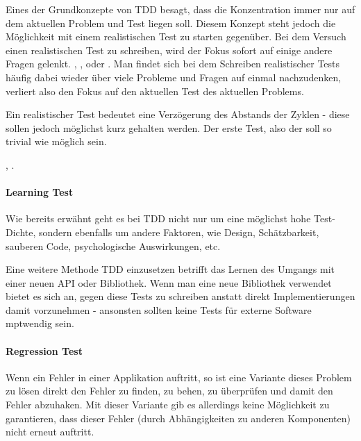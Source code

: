 Eines der Grundkonzepte von TDD besagt, dass die Konzentration immer nur auf dem aktuellen Problem und Test liegen soll. Diesem Konzept steht jedoch die Möglichkeit mit einem realistischen Test zu starten gegenüber. Bei dem Versuch einen realistischen Test zu schreiben, wird der Fokus sofort auf einige andere Fragen gelenkt. , ,  oder . Man findet sich bei dem Schreiben realistischer Tests häufig dabei wieder über viele Probleme und Fragen auf einmal nachzudenken, verliert also den Fokus auf den aktuellen Test des aktuellen Problems.

Ein realistischer Test bedeutet eine Verzögerung des Abstands der  Zyklen - diese sollen jedoch möglichst kurz gehalten werden.
Der erste Test, also der  soll so trivial wie möglich sein.

, \cite[134]{Beck:2003}.

\paragraph{Learning Test}

Wie bereits erwähnt geht es bei TDD nicht nur um eine möglichst hohe Test-Dichte, sondern ebenfalls um andere Faktoren, wie Design, Schätzbarkeit, sauberen Code, psychologische Auswirkungen, etc.

Eine weitere Methode TDD einzusetzen betrifft das Lernen des Umgangs mit einer neuen API oder Bibliothek. Wenn man eine neue Bibliothek verwendet bietet es sich an, gegen diese Tests zu schreiben anstatt direkt Implementierungen damit vorzunehmen - ansonsten sollten keine Tests für externe Software mptwendig sein.\newline\newline

\paragraph{Regression Test}
Wenn ein Fehler in einer Applikation auftritt, so ist eine Variante dieses Problem zu lösen direkt den Fehler zu finden, zu behen, zu überprüfen und damit den Fehler abzuhaken. Mit dieser Variante gib es allerdings keine Möglichkeit zu garantieren, dass dieser Fehler (durch Abhängigkeiten zu anderen Komponenten) nicht erneut auftritt.

